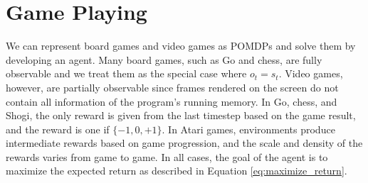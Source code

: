 \section{Game Playing}
We can represent board games and video games as POMDPs and solve them by developing an agent.
Many board games, such as Go and chess, are fully observable and we treat them as the special case where $o_t = s_t$.
Video games, however, are partially observable since frames rendered on the screen do not contain all information of the program's running memory.
In Go, chess, and Shogi, the only reward is given from the last timestep based on the game result, and the reward is one if $\{-1, 0, +1\}$.
In Atari games, environments produce intermediate rewards based on game progression, and the scale and density of the rewards varies from game to game.
In all cases, the goal of the agent is to maximize the expected return as described in Equation \ref{eq:maximize_return}.




